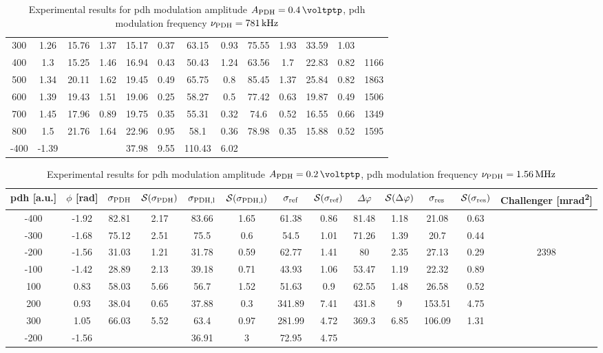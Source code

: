\begin{landscape}
\begin{table}
\begin{tabular}{|c|c|c|c|c|c|c|c|c|c|c|c|c|}
		300 & 1.26 & 15.76 & 1.37 & 15.17 & 0.37 & 63.15 & 0.93 & 75.55 & 1.93 & 33.59 & 1.03 & \\
		400 & 1.3 & 15.25 & 1.46 & 16.94 & 0.43 & 50.43 & 1.24 & 63.56 & 1.7 & 22.83 & 0.82 & 1166\\
		500 & 1.34 & 20.11 & 1.62 & 19.45 & 0.49 & 65.75 & 0.8 & 85.45 & 1.37 & 25.84 & 0.82 & 1863\\
		600 & 1.39 & 19.43 & 1.51 & 19.06 & 0.25 & 58.27 & 0.5 & 77.42 & 0.63 & 19.87 & 0.49 & 1506\\
		700 & 1.45 & 17.96 & 0.89 & 19.75 & 0.35 & 55.31 & 0.32 & 74.6 & 0.52 & 16.55 & 0.66 & 1349\\
		800 & 1.5 & 21.76 & 1.64 & 22.96 & 0.95 & 58.1 & 0.36 & 78.98 & 0.35 & 15.88 & 0.52 & 1595\\
		\hline
		\hline
		-400 & -1.39 & & & 37.98 & 9.55 & 110.43 & 6.02 & & & & & \\
		\hline
	\end{tabular}
	\caption{Experimental results for \gls{pdh} modulation amplitude $\tind{A}{PDH} = \SI{0.4}{\voltptp}$, \gls{pdh} modulation frequency $\nu_{\text{PDH}} = \SI{781}{\kilo\hertz}$}
	\end{table}
	
	
	\begin{table}
	\centering
	\begin{tabular}{|c|c|c|c|c|c|c|c|c|c|c|c|c|}
		\hline
		\gls{pdh} [a.u.] & $\phi$ [\si{\radian}] & $\sigma_{\text{PDH}}$ & $\mathcal{S}(\sigma_{\text{PDH}})$ & $\sigma_{\text{PDH,l}}$ & $\mathcal{S}(\sigma_{\text{PDH,l}})$  & $\sigma_{\text{ref}}$ & $\mathcal{S}(\sigma_{\text{ref}})$ & $\Delta \varphi$ & $\mathcal{S}(\Delta \varphi)$ & $\sigma_{\text{res}}$  & $\mathcal{S}(\sigma_{\text{res}})$ & Challenger [\si{\milli\radian\squared}] \\
		\hline
		\hline
		-400 & -1.92 & 82.81 & 2.17 & 83.66 & 1.65 & 61.38 & 0.86 & 81.48 & 1.18 & 21.08 & 0.63 & \\
		-300 & -1.68 & 75.12 & 2.51 & 75.5 & 0.6 & 54.5 & 1.01 & 71.26 & 1.39 & 20.7 & 0.44 & \\
		-200 & -1.56 & 31.03 & 1.21 & 31.78 & 0.59 & 62.77 & 1.41 & 80 & 2.35 & 27.13 & 0.29 & 2398\\
		-100 & -1.42 & 28.89 & 2.13 & 39.18 & 0.71 & 43.93 & 1.06 & 53.47 & 1.19 & 22.32 & 0.89 & \\
		100 & 0.83 & 58.03 & 5.66 & 56.7 & 1.52 & 51.63 & 0.9 & 62.55 & 1.48 & 26.58 & 0.52 & \\
		200 & 0.93 & 38.04 & 0.65 & 37.88 & 0.3 & 341.89 & 7.41 & 431.8 & 9 & 153.51 & 4.75 & \\
		300 & 1.05 & 66.03 & 5.52 & 63.4 & 0.97 & 281.99 & 4.72 & 369.3 & 6.85 & 106.09 & 1.31 & \\
		\hline
		\hline
		-200 & -1.56 & & & 36.91 & 3 & 72.95 & 4.75 & & & & & \\
		\hline
	\end{tabular}
	\caption{Experimental results for \gls{pdh} modulation amplitude $\tind{A}{PDH} = \SI{0.2}{\voltptp}$, \gls{pdh} modulation frequency $\nu_{\text{PDH}} = \SI{1.56}{\mega\hertz}$}
	\end{table}
	

\end{landscape}
